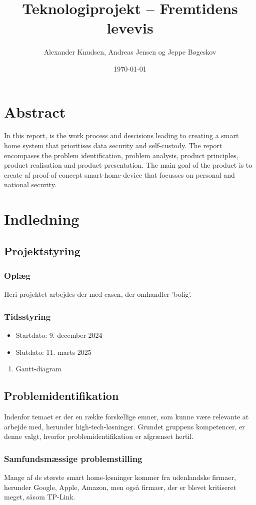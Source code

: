 \documentclass[11pt]{article}
\author{Alexander Knudsen, Andreas Jensen og Jeppe Bøgeskov}
\date{\today}
\title{Teknologiprojekt -- Fremtidens levevis}
\begin{document}


\restoregeometry
\tableofcontents
\newpage
\section{Abstract}
\label{sec:org6419ad8}
In this report, is the work process and descisions leading to creating a smart home system that prioritises data security and self-custody. The report encompases the problem identification, problem analysis, product principles, product realisation and product presentation. The main goal of the product is to create af proof-of-concept smart-home-device that focusses on personal and national security.
\newpage

\section{Indledning}
\label{sec:org6d9531c}
\subsection{Projektstyring}
\label{sec:org5e3ff51}
\subsubsection{Oplæg}
\label{sec:orgbec7f1d}
Heri projektet arbejdes der med casen, der omhandler 'bolig'.
\subsubsection{Tidsstyring}
\label{sec:org730faaa}
\begin{itemize}
\item Startdato: 9. december 2024
\item Slutdato: 11. marts 2025
\end{itemize}
\begin{enumerate}
\item Gantt-diagram
\label{sec:orgb1d2daa}
\end{enumerate}
\subsection{Problemidentifikation}
\label{sec:orgfafb1b0}
Indenfor temaet er der en række forskellige emner, som kunne være relevante at arbejde med, herunder high-tech-løsninger. Grundet gruppens kompetencer, er denne valgt, hvorfor problemidentifikation er afgrænset hertil.
\subsubsection{Samfundsmæssige problemstilling}
\label{sec:orga952bf5}
Mange af de største smart home-løsninger kommer fra udenlandske firmaer, herunder Google, Apple, Amazon, men også firmaer, der er blevet kritiseret meget, såsom TP-Link. 
\end{document}
